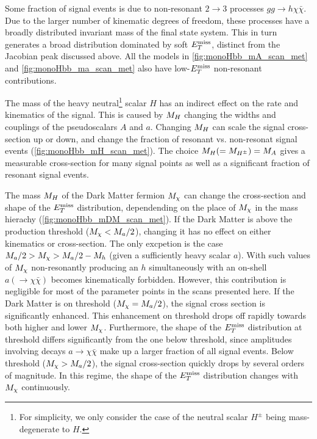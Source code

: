 Some fraction of signal events is due to non-resonant $2 \rightarrow 3$ processes $gg \rightarrow h \chi \bar{\chi}$. 
Due to the larger number of kinematic degrees of freedom, these processes have a broadly distributed  invariant mass of the final state system.
This in turn generates a broad distribution dominated by soft $E_T^\mathrm{miss}$, distinct from the Jacobian peak discussed above.
All the models in \autoref{fig:monoHbb_mA_scan_met} and \autoref{fig:monoHbb_ma_scan_met} also have low-$E_T^\mathrm{miss}$ non-resonant contributions.

The mass of the heavy neutral\footnote{For simplicity, we only consider the case of the neutral scalar $H^{\pm}$ being mass-degenerate to $H$.} 
scalar $H$ has an indirect effect on the rate and kinematics of the signal. 
This is caused by  $M_{H}$ changing the widths and couplings of  the pseudoscalars $A$ and $a$. 
Changing $M_{H}$ can scale the signal cross-section up or down, and change the 
fraction of resonant vs. non-resonat signal events (\autoref{fig:monoHbb_mH_scan_met}). 
The choice $M_{H} (= M_{H^{\pm}}) = M_{A}$ gives a measurable cross-section for many signal points as well as a significant fraction of resonant signal events.

The mass  $M_{H}$ of the Dark Matter fermion $M_{\chi}$ can change the cross-section and shape of the $E_T^\mathrm{miss}$ distribution,
dependending on the place of $M_{\chi}$ in the mass hierachy (\autoref{fig:monoHbb_mDM_scan_met}). 
If the Dark Matter is above the production threshold ($M_{\chi} < M_{a}/2$), changing it has no effect on either kinematics or cross-section. 
The only excpetion is the case $M_{a}/2 > M_{\chi} > M_{a}/2 - M_h$ (given a sufficiently heavy scalar $a$). With such values of $M_{\chi}$
non-resonantly producing an $h$ simultaneously with an on-shell $a (\rightarrow \chi \bar{\chi})$ becomes kinematically forbidden. 
However, this contribution is negligible for most of the parameter points in the scans presented here. 
If the Dark Matter is on threshold ($M_{\chi} = M_{a}/2$), the signal cross section is significantly enhanced. 
This enhancement on threshold drops off rapidly towards both higher and lower $M_{\chi}$. Furthermore, the shape of the $E_T^\mathrm{miss}$ distribution at threshold 
differs significantly from the one below threshold, since amplitudes involving decays $a\rightarrow\chi\bar{\chi}$ 
make up a larger fraction of all signal events. Below threshold ($M_{\chi} > M_{a}/2$), 
the signal cross-section quickly drops by several orders of magnitude. In this regime, 
the shape of the $E_T^\mathrm{miss}$ distribution changes with $M_{\chi}$ continuously.


